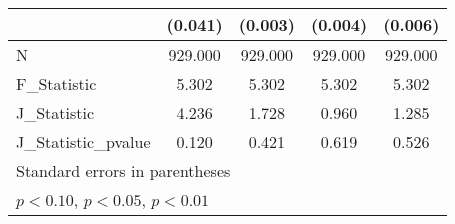 {\begin{tabular}{l*{4}{c}}
            &     (0.041)         &     (0.003)         &     (0.004)         &     (0.006)         \\
\hline
N           &     929.000         &     929.000         &     929.000         &     929.000         \\
F\_Statistic &       5.302         &       5.302         &       5.302         &       5.302         \\
J\_Statistic &       4.236         &       1.728         &       0.960         &       1.285         \\
J\_Statistic\_pvalue&       0.120         &       0.421         &       0.619         &       0.526         \\
\hline\hline
\multicolumn{5}{l}{\footnotesize Standard errors in parentheses}\\
\multicolumn{5}{l}{\footnotesize \sym{*} \(p<0.10\), \sym{**} \(p<0.05\), \sym{***} \(p<0.01\)}\\
\end{tabular}
}
